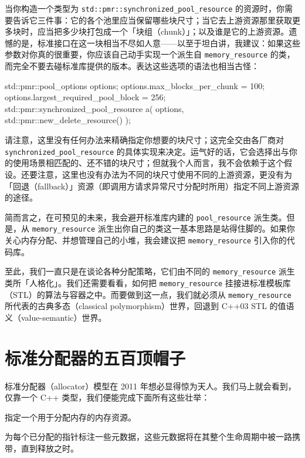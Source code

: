 当你构造一个类型为 \texttt{std::\allowbreak{}pmr::\allowbreak{}synchronized\_\allowbreak{}pool\_\allowbreak{}resource} 的资源时，你需要告诉它三件事：它的各个池里应当保留哪些块尺寸；当它去上游资源那里获取更多块时，应当把多少块打包成一个「块组（chunk）」；以及谁是它的上游资源。遗憾的是，标准接口在这一块相当不尽如人意——以至于坦白讲，我建议：如果这些参数对你真的很重要，你应该自己动手实现一个派生自 \texttt{memory\_\allowbreak{}resource} 的类，而完全不要去碰标准库提供的版本。表达这些选项的语法也相当古怪：

\begin{codebox}[cpp]
     std::pmr::pool_options options;
     options.max_blocks_per_chunk = 100;
     options.largest_required_pool_block = 256;
     std::pmr::synchronized_pool_resource a(
       options,
       std::pmr::new_delete_resource()
     );
\end{codebox}

请注意，这里没有任何办法来精确指定你想要的块尺寸；这完全交由各厂商对 \texttt{synchronized\_\allowbreak{}pool\_\allowbreak{}resource} 的具体实现来决定。运气好的话，它会选择出与你的使用场景相匹配的、还不错的块尺寸；但就我个人而言，我不会依赖于这个假设。还要注意，这里也没有办法为不同的块尺寸使用不同的上游资源，更没有为「回退（fallback）」资源（即调用方请求异常尺寸分配时所用）指定不同上游资源的途径。

简而言之，在可预见的未来，我会避开标准库内建的 \texttt{pool\_\allowbreak{}resource} 派生类。但是，从 \texttt{memory\_\allowbreak{}resource} 派生出你自己的类这一基本思路是站得住脚的。如果你关心内存分配、并想管理自己的小堆，我会建议把 \texttt{memory\_\allowbreak{}resource} 引入你的代码库。

至此，我们一直只是在谈论各种分配策略，它们由不同的 \texttt{memory\_\allowbreak{}resource} 派生类所「人格化」。我们还需要看看，如何把 \texttt{memory\_\allowbreak{}resource} 挂接进标准模板库（STL）的算法与容器之中。而要做到这一点，我们就必须从 \texttt{memory\_\allowbreak{}resource} 所代表的古典多态（classical polymorphism）世界，回退到 C++03 STL 的值语义（value-semantic）世界。

\section{标准分配器的五百顶帽子}

标准分配器（allocator）模型在 2011 年想必显得惊为天人。我们马上就会看到，仅靠一个 C++ 类型，我们便能完成下面所有这些壮举：

指定一个用于分配内存的内存资源。

为每个已分配的指针标注一些元数据，这些元数据将在其整个生命周期中被一路携带，直到释放之时。

